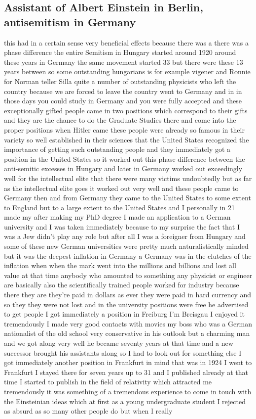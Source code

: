 \documentclass{article}
\begin{document}
\subsection{Assistant of Albert Einstein in Berlin, antisemitism in Germany}
this had in a certain sense very beneficial effects because there was a there was a phase difference the entire Semitism in Hungary started around 1920 around these years in Germany the same movement started 33 but there were these 13 years between so some outstanding hungarians is for example vigener and Ronnie for Norman teller Silla quite a number of outstanding physicists who left the country because we are forced to leave the country went to Germany and in in those days you could study in Germany and you were fully accepted and these exceptionally gifted people came in two positions which correspond to their gifts and they are the chance to do the Graduate Studies there and come into the proper positions when Hitler came these people were already so famous in their variety so well established in their sciences that the United States recognized the importance of getting such outstanding people and they immediately got a position in the United States so it worked out this phase difference between the anti-semitic excesses in Hungary and later in Germany worked out exceedingly well for the intellectual elite that there were many victims undoubtedly but as far as the intellectual elite goes it worked out very well and these people came to Germany then and from Germany they came to the United States to some extent to England but to a large extent to the United States and I personally in 21 made my after making my PhD degree I made an application to a German university and I was taken immediately because to my surprise the fact that I was a Jew didn't play any role but after all I was a foreigner from Hungary and some of these new German universities were pretty much naturalistically minded but it was the deepest inflation in Germany a Germany was in the clutches of the inflation when when the mark went into the millions and billions and lost all value at that time anybody who amounted to something any physicist or engineer are basically also the scientifically trained people worked for industry because there they are they're paid in dollars as ever they were paid in hard currency and so they they were not lost and in the university positions were free he advertised to get people I got immediately a position in Freiburg I'm Breisgau I enjoyed it tremendously I made very good contacts with movies my boss who was a German nationalist of the old school very conservative in his outlook but a charming man and we got along very well he became seventy years at that time and a new successor brought his assistants along so I had to look out for something else I got immediately another position in Frankfurt in mind that was in 1924 I went to Frankfurt I stayed there for seven years up to 31 and I published already at that time I started to publish in the field of relativity which attracted me tremendously it was something of a tremendous experience to come in touch with the Einsteinian ideas which at first as a young undergraduate student I rejected as absurd as so many other people do but when I really 
\end{document}
